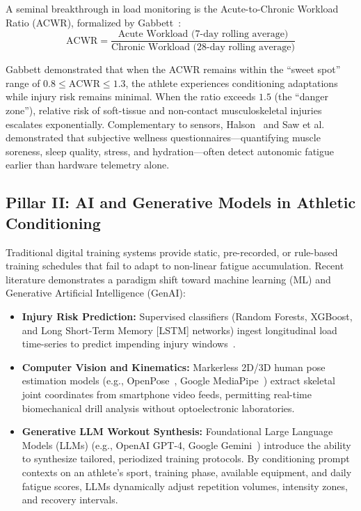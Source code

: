 \documentclass[conference]{IEEEtran}
\begin{document}
A seminal breakthrough in load monitoring is the Acute-to-Chronic Workload Ratio (ACWR), formalized by Gabbett~\cite{gabbett2016}:
\begin{equation}
\text{ACWR} = \frac{\text{Acute Workload (7-day rolling average)}}{\text{Chronic Workload (28-day rolling average)}}
\end{equation}

Gabbett demonstrated that when the ACWR remains within the ``sweet spot'' range of $0.8 \le \text{ACWR} \le 1.3$, the athlete experiences conditioning adaptations while injury risk remains minimal. When the ratio exceeds $1.5$ (the ``danger zone''), relative risk of soft-tissue and non-contact musculoskeletal injuries escalates exponentially. Complementary to sensors, Halson~\cite{halson2014} and Saw et al.~\cite{saw2016} demonstrated that subjective wellness questionnaires---quantifying muscle soreness, sleep quality, stress, and hydration---often detect autonomic fatigue earlier than hardware telemetry alone.

\subsection{Pillar II: AI and Generative Models in Athletic Conditioning}
Traditional digital training systems provide static, pre-recorded, or rule-based training schedules that fail to adapt to non-linear fatigue accumulation. Recent literature demonstrates a paradigm shift toward machine learning (ML) and Generative Artificial Intelligence (GenAI):
\begin{itemize}
    \item \textbf{Injury Risk Prediction:} Supervised classifiers (Random Forests, XGBoost, and Long Short-Term Memory [LSTM] networks) ingest longitudinal load time-series to predict impending injury windows~\cite{rossi2018}.
    \item \textbf{Computer Vision and Kinematics:} Markerless 2D/3D human pose estimation models (e.g., OpenPose~\cite{cao2021}, Google MediaPipe~\cite{lugaresi2019}) extract skeletal joint coordinates from smartphone video feeds, permitting real-time biomechanical drill analysis without optoelectronic laboratories.
    \item \textbf{Generative LLM Workout Synthesis:} Foundational Large Language Models (LLMs) (e.g., OpenAI GPT-4, Google Gemini~\cite{achiam2023}) introduce the ability to synthesize tailored, periodized training protocols. By conditioning prompt contexts on an athlete's sport, training phase, available equipment, and daily fatigue scores, LLMs dynamically adjust repetition volumes, intensity zones, and recovery intervals.
\end{itemize}
\end{document}
